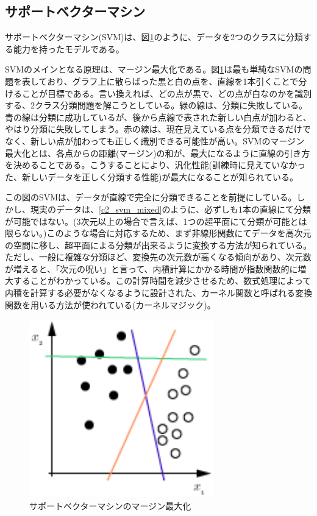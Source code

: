 
\subsection{サポートベクターマシン}
サポートベクターマシン(SVM)は、図\ref{c2_svm}のように、データを2つのクラスに分類する能力を持ったモデルである\cite{cortes1995support-vector}。\par
SVMのメインとなる原理は、マージン最大化である。図\ref{c2_svm}は最も単純なSVMの問題を表しており、グラフ上に散らばった黒と白の点を、直線を1本引くことで分けることが目標である。言い換えれば、どの点が黒で、どの点が白なのかを識別する、2クラス分類問題を解こうとしている。緑の線は、分類に失敗している。青の線は分類に成功しているが、後から点線で表された新しい白点が加わると、やはり分類に失敗してしまう。赤の線は、現在見えている点を分類できるだけでなく、新しい点が加わっても正しく識別できる可能性が高い。SVMのマージン最大化とは、各点からの距離(マージン)の和が、最大になるように直線の引き方を決めることである。こうすることにより、汎化性能(訓練時に見えていなかった、新しいデータを正しく分類する性能)が最大になることが知られている。\par
この図のSVMは、データが直線で完全に分類できることを前提にしている。しかし、現実のデータは、\ref{c2_svm_mixed}のように、必ずしも1本の直線にて分類が可能ではない。(3次元以上の場合で言えば、1つの超平面にて分類が可能とは限らない。)このような場合に対応するため、まず非線形関数にてデータを高次元の空間に移し、超平面による分類が出来るように変換する方法が知られている\cite{burges1998a-tutorial}。ただし、一般に複雑な分類ほど、変換先の次元数が高くなる傾向があり、次元数が増えると、「次元の呪い」と言って、内積計算にかかる時間が指数関数的に増大することがわかっている\cite{bellman1961adaptive}。この計算時間を減少させるため、数式処理によって内積を計算する必要がなくなるように設計された、カーネル関数と呼ばれる変換関数を用いる方法が使われている(カーネルマジック)。
\begin{figure}[tbp]
 \centering
  \includegraphics[width=80mm]{img/c2/svm}
 \caption{サポートベクターマシンのマージン最大化}
 \label{c2_svm}
\end{figure}
